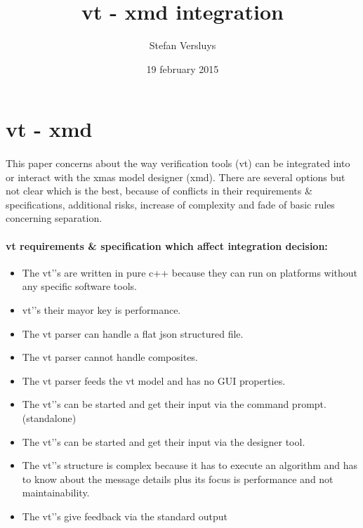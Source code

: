 \documentclass[a4paper,11pt,final]{article}
\begin{document}



\title{\large vt - xmd integration}
\date{19 february 2015}
\author{Stefan Versluys}

\maketitle


\tableofcontents

\newpage

\section{vt - xmd}
\paragraph{}
This paper concerns about the way verification tools (vt) can be integrated
into or interact with the xmas model designer (xmd). There are several
options but not clear which is the best, because of conflicts in their
requirements \& specifications, additional risks, increase of complexity
and fade of basic rules concerning separation. 


\paragraph{vt requirements \& specification which affect integration decision:}
\begin{itemize}
\item The vt'’s are written in pure c++ because they can run on platforms without any specific software tools.
\item vt'’s their mayor key is performance.
\item The vt parser can handle a flat json structured file.
\item The vt parser cannot handle composites.
\item The vt parser feeds the vt model and has no GUI properties.
\item The vt'’s can be started and get their input via the command prompt. (standalone)
\item The vt'’s can be started and get their input via the designer tool.
\item The vt'’s structure is complex because it has to execute an algorithm and has to know
	about the message details plus its focus is performance and not maintainability.
\item The vt'’s give feedback via the standard output
\end{itemize}
\end{document}
